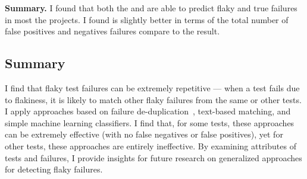 {%
\textbf{Summary.} I found that both the \classifier and \tfidf are able to predict flaky and true failures in most the projects. I found \tfidf is slightly better in terms of the total number of false positives and negatives failures compare to the \classifier result.



\subsection{Summary}
I find that flaky test failures can be extremely repetitive --- when a test fails due to flakiness, it is likely to match other flaky failures from the same or other tests.
I apply approaches based on failure de-duplication~\cite{Podgurski03Automated,Jiang17WhatCauses}, text-based matching, and simple machine learning classifiers.
I find that, for some tests, these approaches can be extremely effective (with no false negatives or false positives), yet for other tests, these approaches are entirely ineffective.
By examining attributes of tests and failures, I provide insights for future research on generalized approaches for detecting flaky failures.



















}
